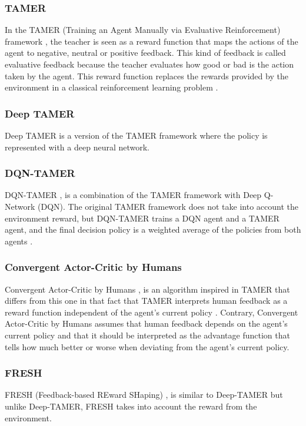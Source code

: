 \subsubsection*{TAMER}
In the TAMER (Training an Agent Manually via Evaluative Reinforcement) framework \cite{TAMER-Knox-Stone:2009}, the teacher is seen as a reward function that maps the actions of the agent to negative, neutral or positive feedback. This kind of feedback is called evaluative feedback because the teacher evaluates how good or bad is the action taken by the agent. This reward function replaces the rewards provided by the environment in a classical reinforcement learning problem \cite{leveraging-human-guidance:2019}.
 

\subsubsection*{Deep TAMER}
Deep TAMER \cite{DeepTAMER-Warnell-et-al:2018} is a version of the TAMER framework \cite{TAMER-Knox-Stone:2009} where the policy is represented with a deep neural network.

\subsubsection*{DQN-TAMER}
DQN-TAMER \cite{DQN-TAMER-Arakawa:2018}, is a combination of the TAMER framework \cite{TAMER-Knox-Stone:2009} with Deep Q-Network (DQN). The original TAMER framework does not take into account the environment reward, but DQN-TAMER trains a DQN agent and a TAMER agent, and the final decision policy is a weighted average of the policies from both agents \cite{leveraging-human-guidance:2019}.

\subsubsection*{Convergent Actor-Critic by Humans}
Convergent Actor-Critic by Humans \cite{fakeCOACH-MacGlashan-Ho-Loftin:2017}, is an algorithm inspired in TAMER \cite{TAMER-Knox-Stone:2009} that differs from this one in that fact that TAMER interprets human feedback as a reward function independent of the agent’s current policy \cite{leveraging-human-guidance:2019}. 
Contrary, Convergent Actor-Critic by Humans assumes that human feedback depends on the agent's current policy and that it should be interpreted as the advantage function that tells how much better or worse when deviating from the agent’s current policy.

\subsubsection*{FRESH}
FRESH (Feedback-based REward SHaping) \cite{FRESH-xiao:2020}, is similar to Deep-TAMER \cite{DeepTAMER-Warnell-et-al:2018} but unlike Deep-TAMER, FRESH takes into account the reward from the environment.



